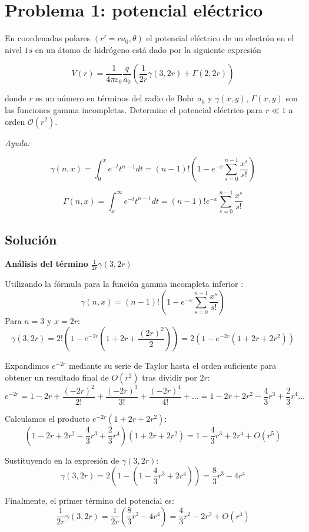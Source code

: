 \documentclass[a4paper]{article}
\begin{document}
\section{Problema 1: potencial eléctrico}
En coordenadas polares $(r'=ra_0,\theta)$ el potencial eléctrico de un electrón en el nivel $1s$ en un átomo de hidrógeno está dado por la siguiente expresión

$$V(r) = \frac{1}{4\pi\varepsilon_0}\frac{q}{a_0}\left(\frac{1}{2r} \gamma(3,2r) + \Gamma(2,2r)\right)$$ 

donde $r$ es un número en términos del radio de Bohr $a_0$ y $\gamma(x, y)$, $\Gamma(x, y)$ son las funciones gamma incompletas. Determine el potencial eléctrico para $r\ll 1$ a orden $\mathcal{O}(r^2)$.

\textit{Ayuda:}

$$\gamma(n, x) = \int_{0}^{x}e^{-t}t^{n-1}dt = (n-1)!\left(1-e^{-x}\sum_{s=0}^{n-1} \frac{x^s}{s!}\right)$$

$$\Gamma(n, x) = \int_{x}^{\infty}e^{-t}t^{n-1}dt = (n-1)!e^{-x}\sum_{s=0}^{n-1} \frac{x^s}{s!}$$

\subsection{Solución}

\textbf{Análisis del término $\frac{1}{2r} \gamma(3, 2r)$}

Utilizando la fórmula para la función gamma incompleta inferior :
$$\gamma(n, x) = (n-1)! \left( 1 - e^{-x} \sum_{s=0}^{n-1} \frac{x^s}{s!} \right)$$
Para $n=3$ y $x=2r$:
$$\gamma(3, 2r) = 2! \left( 1 - e^{-2r} (1 + 2r + \frac{(2r)^2}{2}) \right) = 2 \left( 1 - e^{-2r}(1 + 2r + 2r^2) \right)$$

Expandimos $e^{-2r}$ mediante su serie de Taylor hasta el orden suficiente para obtener un resultado final de $O(r^2)$ tras dividir por $2r$:
$$e^{-2r} = 1 - 2r + \frac{(-2r)^2}{2!} + \frac{(-2r)^3}{3!} + \frac{(-2r)^4}{4!} + \dots = 1 - 2r + 2r^2 - \frac{4}{3}r^3 + \frac{2}{3}r^4 \dots$$

Calculamos el producto $e^{-2r}(1 + 2r + 2r^2)$:
$$(1 - 2r + 2r^2 - \frac{4}{3}r^3 + \frac{2}{3}r^4)(1 + 2r + 2r^2) = 1 - \frac{4}{3}r^3 + 2r^4 + O(r^5)$$

Sustituyendo en la expresión de $\gamma(3, 2r)$:
$$\gamma(3, 2r) = 2 \left( 1 - (1 - \frac{4}{3}r^3 + 2r^4) \right) = \frac{8}{3}r^3 - 4r^4$$

Finalmente, el primer término del potencial es:
$$\frac{1}{2r} \gamma(3, 2r) = \frac{1}{2r} (\frac{8}{3}r^3 - 4r^4) = \frac{4}{3}r^2 - 2r^3 + O(r^4)$$
\end{document}

